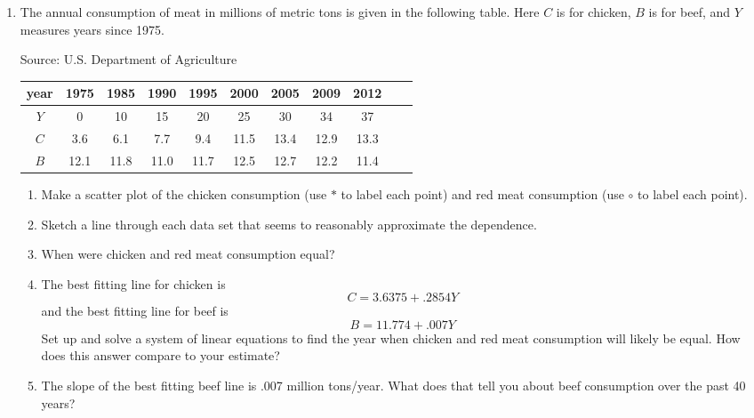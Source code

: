 \begin{enumerate}
\item The annual consumption of meat in millions of metric tons is given in the following table. Here $C$ is for chicken, $B$ is for beef, and $Y$ measures years since 1975.

\hfill \begin{footnotesize} Source: U.S. Department of Agriculture \end{footnotesize}
\begin{center}
\begin{tabular} {|c| |c |c |c |c |c |c |c |c |c |c|}\hline
year & 1975 & 1985 & 1990 & 1995 & 2000 & 2005 & 2009 & 2012\\ \hline
$Y$ & 0 & 10 & 15 & 20 & 25 & 30 & 34 & 37\\ \hline
$C$ & 3.6 & 6.1 & 7.7 &9.4 & 11.5 & 13.4 & 12.9 & 13.3\\ \hline
$B$ & 12.1 & 11.8 & 11.0 & 11.7 & 12.5 & 12.7 & 12.2 & 11.4\\ \hline
\end{tabular}
\end{center}
\begin{enumerate}
\item Make a scatter plot of the chicken consumption (use $\ast$ to label each point) and red meat consumption (use $\circ$ to label each point).
\item Sketch a line through each data set that seems to reasonably approximate the dependence.
\item When were chicken and red meat consumption equal?
\item The best fitting line for chicken is $$C =3.6375+.2854Y$$ and the best fitting line for beef is $$B=11.774+.007Y$$  Set up and solve a system of linear equations to find the year when  chicken and red meat consumption will likely be equal.  How does this answer compare to your estimate?
\item The slope of the best fitting beef line is .007 million tons/year. What does that tell you about beef consumption over the past 40 years?
\end{enumerate}  %

\end{enumerate}
